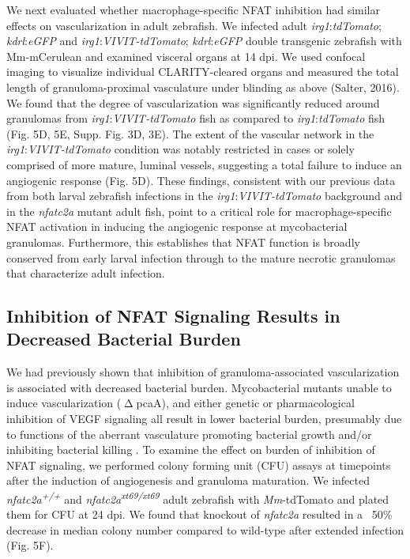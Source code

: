We next evaluated whether macrophage-specific NFAT inhibition had similar effects on vascularization in adult zebrafish. We infected adult \textit{irg1}:\textit{tdTomato}; \textit{kdrl}:\textit{eGFP} and \textit{irg1}:\textit{VIVIT-tdTomato}; \textit{kdrl}:\textit{eGFP} double transgenic zebrafish with Mm-mCerulean and examined visceral organs at 14 dpi. We used confocal imaging to visualize individual CLARITY-cleared organs and measured the total length of granuloma-proximal vasculature under blinding as above (Salter, 2016). We found that the degree of vascularization was significantly reduced around granulomas from \textit{irg1}:\textit{VIVIT-tdTomato} fish as compared to \textit{irg1}:\textit{tdTomato} fish (Fig. 5D, 5E, Supp. Fig. 3D, 3E). The extent of the vascular network in the \textit{irg1}:\textit{VIVIT-tdTomato} condition was notably restricted in cases or solely comprised of more mature, luminal vessels, suggesting a total failure to induce an angiogenic response (Fig. 5D). These findings, consistent with our previous data from both larval zebrafish infections in the \textit{irg1}:\textit{VIVIT-tdTomato} background and in the \textit{nfatc2a} mutant adult fish, point to a critical role for macrophage-specific NFAT activation in inducing the angiogenic response at mycobacterial granulomas. Furthermore, this establishes that NFAT function is broadly conserved from early larval infection through to the mature necrotic granulomas that characterize adult infection.

\subsection{Inhibition of NFAT Signaling Results in Decreased Bacterial Burden}

We had previously shown that inhibition of granuloma-associated vascularization is associated with decreased bacterial burden. Mycobacterial mutants unable to induce vascularization ($\upDelta$pcaA), and either genetic or pharmacological inhibition of VEGF signaling all result in lower bacterial burden, presumably due to functions of the aberrant vasculature promoting bacterial growth and/or inhibiting bacterial killing \citep{Rao2005, Glickman2000, Oehlers2015, Walton2018}. To examine the effect on burden of inhibition of NFAT signaling, we performed colony forming unit (CFU) assays at timepoints after the induction of angiogenesis and granuloma maturation. We infected \textit{nfatc2a\textsuperscript{+/+}} and \textit{nfatc2a\textsuperscript{xt69/xt69}} adult zebrafish with \textit{Mm}-tdTomato and plated them for CFU at 24 dpi. We found that knockout of \textit{nfatc2a} resulted in a ~50\% decrease in median colony number compared to wild-type after extended infection (Fig. 5F). 

